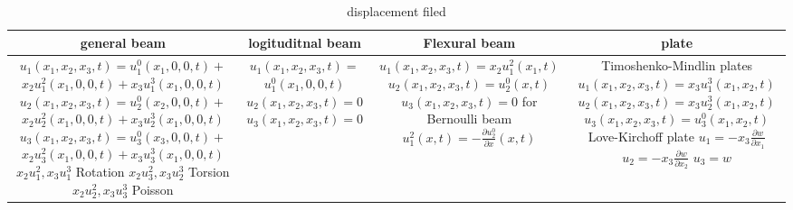 \documentclass{article}
\begin{document}
\begin{multicols*}{3}
\begin{table*}
  \centering
  \caption{displacement filed}
  \begin{tabular}{|c|c|c|c|}
    \hline
    general beam & logituditnal beam  & Flexural beam & plate\\
    \hline
    \makecell[c]{
      $u_{1}(x_{1},x_{2},x_{3},t)=u_{1}^{0}(x_{1},0,0,t)+$\\$x_{2}u_{1}^{2}(x_{1},0,0,t)+x_{3}u_{1}^{3}(x_{1},0,0,t)$\\
      $u_{2}(x_{1},x_{2},x_{3},t)=u_{2}^{0}(x_{2},0,0,t)+$\\$x_{2}u_{2}^{2}(x_{1},0,0,t)+x_{3}u_{2}^{3}(x_{1},0,0,t)$\\
      $u_{3}(x_{1},x_{2},x_{3},t)=u_{3}^{0}(x_{3},0,0,t)+$\\$x_{2}u_{3}^{2}(x_{1},0,0,t)+x_{3}u_{3}^{3}(x_{1},0,0,t)$\\
      $x_{2}u_1^2, x_{3}u_1^3$ Rotation \\
      $x_{2}u_3^2, x_{3}u_2^3$ Torsion \\
      $x_{2}u_2^2, x_{3}u_3^3$ Poisson
    }
    &\makecell[c]{
      $u_{1}(x_{1},x_{2},x_{3},t)=$\\$u_{1}^{0}(x_{1},0,0,t)$\\
      $u_{2}(x_{1},x_{2},x_{3},t)=0$\\
      $u_{3}(x_{1},x_{2},x_{3},t)=0$\\
    }
    &\makecell[c]{
      $u_{1}(x_{1},x_{2},x_{3},t)=x_{2}u_{1}^{2}(x_{1},t)$\\
      $u_{2}(x_{1},x_{2},x_{3},t)=u_{2}^{0}(x,t)$\\
      $u_{3}(x_{1},x_{2},x_{3},t)=0$\\
      for Bernoulli beam \\
      $u_{1}^{2}(x,t)=-\frac{\partial u_{2}^{0}}{\partial x}(x,t)$
    }
    &\makecell[c]{
      Timoshenko-Mindlin plates\\
      $u_{1}(x_{1},x_{2},x_{3},t)=x_{3}u_{1}^{3}(x_{1},x_{2},t)$\\
      $u_{2}(x_{1},x_{2},x_{3},t)=x_{3}u_{2}^{3}(x_{1},x_{2},t)$\\
      $u_{3}(x_{1},x_{2},x_{3},t)=u_{3}^{0}(x_{1},x_{2},t)$\\
      Love-Kirchoff plate\\
      $u_{1}=-x_{3}\frac{\partial w}{\partial x_{1}}$\\
      $u_{2}=-x_{3}\frac{\partial w}{\partial x_{2}}$\\
      $u_{3}=w$
    }\\
    \hline
  \end{tabular}
\end{table*}


\end{multicols*}
\end{document}

